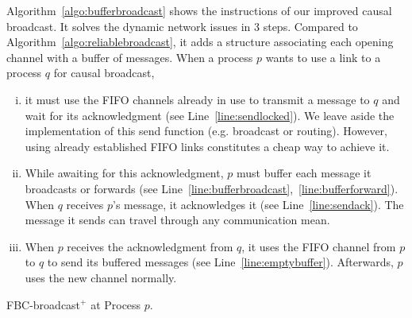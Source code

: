 


Algorithm~\ref{algo:bufferbroadcast} shows the instructions of our improved
causal broadcast. It solves the dynamic network issues in 3 steps.  Compared to
Algorithm~\ref{algo:reliablebroadcast}, it adds a structure associating each
opening channel with a buffer of messages.  When a process $p$ wants to use a
link to a process $q$ for causal broadcast,
\begin{enumerate}[(i)]
\item it must use the FIFO channels already in use to transmit a message to $q$
  and wait for its acknowledgment (see Line~\ref{line:sendlocked}). We leave
  aside the implementation of this send function (e.g. broadcast or
  routing). However, using already established FIFO links constitutes a cheap
  way to achieve it.
\item While awaiting for this acknowledgment, $p$ must buffer each message it
  broadcasts or forwards (see
  Line~\ref{line:bufferbroadcast},~\ref{line:bufferforward}). When $q$ receives
  $p$'s message, it acknowledges it (see Line~\ref{line:sendack}). The message it sends can travel through any
  communication mean.
\item When $p$ receives the acknowledgment from $q$, it uses the FIFO channel
  from $p$ to $q$ to send its buffered messages (see
  Line~\ref{line:emptybuffer}). Afterwards, $p$ uses the new channel normally.
\end{enumerate}

\begin{algorithm}[h]
  
  \caption{\label{algo:bufferbroadcast}FBC-broadcast$^+$ at Process $p$.}
\end{algorithm}




